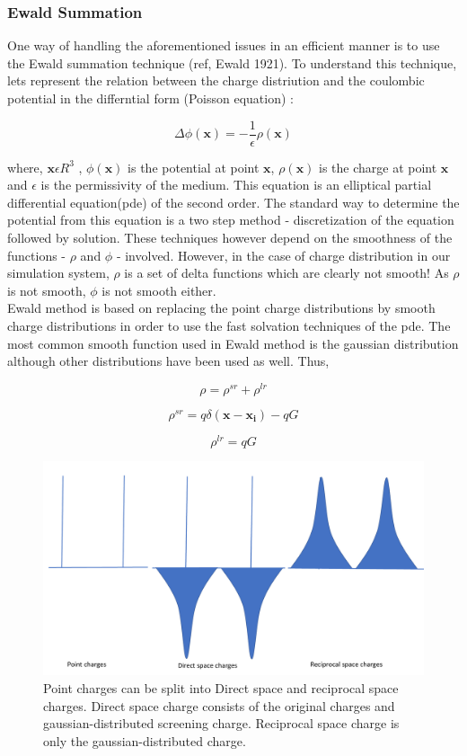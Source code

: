 \documentclass[9pt,bestpractices]{livecoms}
\begin{document}
\subsubsection{ Ewald Summation}

One way of handling the aforementioned issues in an efficient manner is to use the Ewald summation technique (ref, Ewald 1921). To understand this technique, lets represent the relation between the charge distriution and the coulombic potential  in the differntial form (Poisson equation) :

\[
\Delta \phi(\boldsymbol{x}) = - \frac{1}{\epsilon} \rho(\boldsymbol{x}) 
\] 

where,  $ \boldsymbol{x} \epsilon R^3 $ ,  $\phi(\boldsymbol{x})$ is the potential at point $\boldsymbol{x}$, $\rho(\boldsymbol{x})$ is the charge at point $\boldsymbol{x}$ and $\epsilon$ is the permissivity of the medium. This equation is an elliptical partial differential equation(pde) of the second order. The standard way to determine the potential from this equation is a two step method - discretization of the equation followed by solution. These techniques however depend on the smoothness of the functions - $\rho$ and $\phi$ - involved. However, in the case of charge distribution in our simulation system, $\rho$ is a set of delta functions which are clearly not smooth! As $\rho$ is not smooth, $\phi$ is not smooth either. \\

   
Ewald method is based on replacing the point charge distributions by smooth charge distributions in order to use the fast solvation techniques of the pde. The most common smooth function used in Ewald method is the gaussian distribution although other distributions have been used as well. Thus,

\[ \rho = \rho^{sr} + \rho^{lr} \]

\[ \rho^{sr} = q\delta(\boldsymbol{x}-\boldsymbol{x_i}) - qG\] 

\[ \rho^{lr} = qG \]      


\begin{figure}[h]
\centering
\includegraphics[width=\linewidth]{charges_ewald.pdf}
    \caption{Point charges can be split into Direct space and reciprocal space charges. Direct space charge consists of the original charges and gaussian-distributed screening charge. Reciprocal space charge is only the gaussian-distributed charge.}
\label{charges_ewald}
\end{figure}
\end{document}
